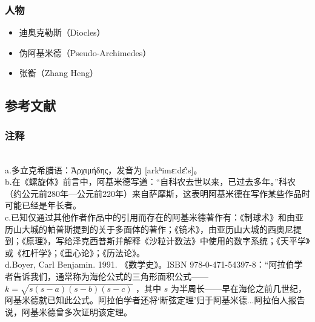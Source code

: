 \subsubsection{人物}  
\begin{itemize}
\item 迪奥克勒斯（Diocles）  
\item 伪阿基米德（Pseudo-Archimedes）  
\item 张衡（Zhang Heng）
\end{itemize}
\subsection{参考文献}  
\subsubsection{注释}\\  
a.多立克希腊语：Ἀρχιμήδης，发音为 [arkʰimɛːdɛ̂ːs]。\\  
b.在《螺旋体》前言中，阿基米德写道：“自科农去世以来，已过去多年。”科农（约公元前280年—公元前220年）来自萨摩斯，这表明阿基米德在写作某些作品时可能已经是年长者。\\  
c.已知仅通过其他作者作品中的引用而存在的阿基米德著作有：《制球术》和由亚历山大城的帕普斯提到的关于多面体的著作；《镜术》，由亚历山大城的西奥尼提到；《原理》，写给泽克西普斯并解释《沙粒计数法》中使用的数字系统；《天平学》或《杠杆学》；《重心论》；《历法论》。\\  
d.Boyer, Carl Benjamin. 1991. 《数学史》。ISBN 978-0-471-54397-8：“阿拉伯学者告诉我们，通常称为海伦公式的三角形面积公式—— \( k = \sqrt{s(s-a)(s-b)(s-c)} \) ，其中 \( s \) 为半周长——早在海伦之前几世纪，阿基米德就已知此公式。阿拉伯学者还将‘断弦定理’归于阿基米德...阿拉伯人报告说，阿基米德曾多次证明该定理。
